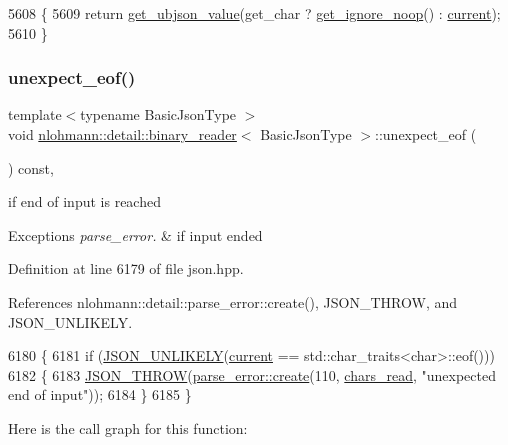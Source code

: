 \begin{DoxyCode}
5608     \{
5609         \textcolor{keywordflow}{return} \hyperlink{classnlohmann_1_1detail_1_1binary__reader_ad8507c0dd14bbddc76c7937c0305a15a}{get\_ubjson\_value}(get\_char ? \hyperlink{classnlohmann_1_1detail_1_1binary__reader_a372a4b61f0c57f3d4f1e9484a416a3cd}{get\_ignore\_noop}() : 
      \hyperlink{classnlohmann_1_1detail_1_1binary__reader_a7e994e201b215cd6d6ae28a1853f43e0}{current});
5610     \}
\end{DoxyCode}
\mbox{\label{classnlohmann_1_1detail_1_1binary__reader_a1dfc55484af3a896c376b41cd99f3e15}} 
\subsubsection{\texorpdfstring{unexpect\+\_\+eof()}{unexpect\_eof()}}
{\footnotesize\ttfamily template$<$typename Basic\+Json\+Type $>$ \\
void \hyperlink{classnlohmann_1_1detail_1_1binary__reader}{nlohmann\+::detail\+::binary\+\_\+reader}$<$ Basic\+Json\+Type $>$\+::unexpect\+\_\+eof (\begin{DoxyParamCaption}{ }\end{DoxyParamCaption}) const\hspace{0.3cm}{\ttfamily [inline]}, {\ttfamily [private]}}

if end of input is reached 
\begin{DoxyExceptions}{Exceptions}
{\em parse\+\_\+error.} & if input ended \\
\hline
\end{DoxyExceptions}


Definition at line 6179 of file json.\+hpp.



References nlohmann\+::detail\+::parse\+\_\+error\+::create(), J\+S\+O\+N\+\_\+\+T\+H\+R\+OW, and J\+S\+O\+N\+\_\+\+U\+N\+L\+I\+K\+E\+LY.


\begin{DoxyCode}
6180     \{
6181         \textcolor{keywordflow}{if} (\hyperlink{json_8hpp_ab77582407c64944e7db1ea95ab520253}{JSON\_UNLIKELY}(\hyperlink{classnlohmann_1_1detail_1_1binary__reader_a7e994e201b215cd6d6ae28a1853f43e0}{current} == std::char\_traits<char>::eof()))
6182         \{
6183             \hyperlink{json_8hpp_a6c274f6db2e65c1b66c7d41b06ad690f}{JSON\_THROW}(\hyperlink{classnlohmann_1_1detail_1_1parse__error_a9fd60ad6bce80fd99686ad332faefd37}{parse\_error::create}(110, 
      \hyperlink{classnlohmann_1_1detail_1_1binary__reader_a2dbde0b7390100efe0bfc54e21c3a34b}{chars\_read}, \textcolor{stringliteral}{"unexpected end of input"}));
6184         \}
6185     \}
\end{DoxyCode}
Here is the call graph for this function\+:


